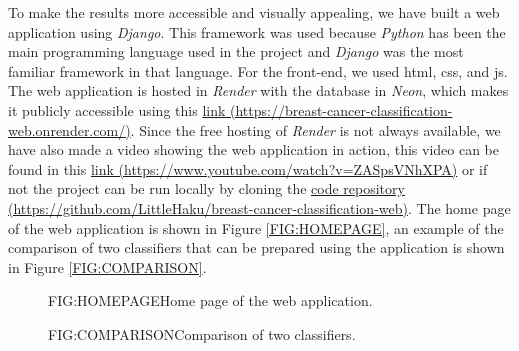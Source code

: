 
To make the results more accessible and visually appealing, we have built a web application using \textit{Django}. This framework was used because \textit{Python} has been the main programming language used in the project and \textit{Django} was the most familiar framework in that language. For the front-end, we used \ac{html}, \ac{css}, and \ac{js}. The web application is hosted in \textit{Render} with the database in \textit{Neon}, which makes it publicly accessible using this \href{https://breast-cancer-classification-web.onrender.com/}{link (https://breast-cancer-classification-web.onrender.com/)}. Since the free hosting of \textit{Render} is not always available, we have also made a video showing the web application in action, this video can be found in this \href{https://www.youtube.com/watch?v=ZASpsVNhXPA}{link (https://www.youtube.com/watch?v=ZASpsVNhXPA)} or if not the project can be run locally by cloning the \href{https://github.com/LittleHaku/breast-cancer-classification-web}{code repository (https://github.com/LittleHaku/breast-cancer-classification-web)}.
The home page of the web application is shown in Figure \ref{FIG:HOMEPAGE}, an example of the comparison of two classifiers that can be prepared using the application is shown in Figure \ref{FIG:COMPARISON}.

\begin{figure}[Web Application Home Page]{FIG:HOMEPAGE}{Home page of the web application.}
\end{figure}

\begin{figure}[Web Application Comparison]{FIG:COMPARISON}{Comparison of two classifiers.}
\end{figure}
